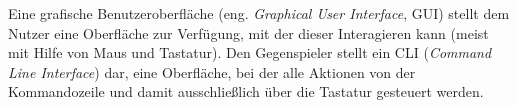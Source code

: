 
Eine grafische Benutzeroberfläche (eng. \textit{Graphical User Interface}, GUI) stellt dem Nutzer eine Oberfläche zur Verfügung, mit der dieser Interagieren kann (meist mit Hilfe von Maus und Tastatur). Den Gegenspieler stellt ein CLI (\textit{Command Line Interface}) dar, eine Oberfläche, bei der alle Aktionen von der Kommandozeile und damit ausschließlich über die Tastatur gesteuert werden.